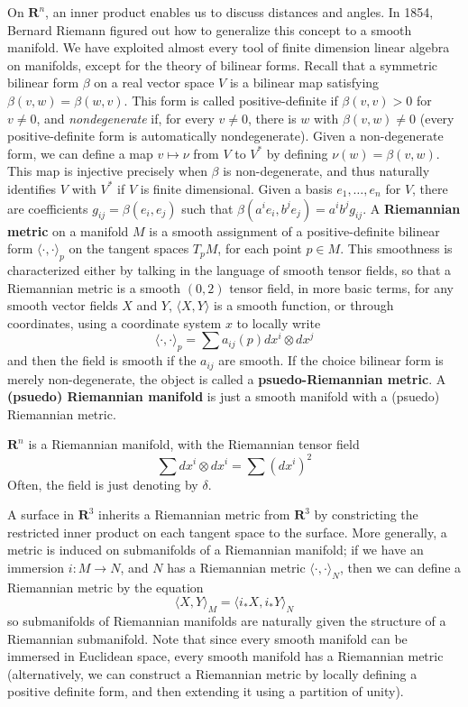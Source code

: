 On $\mathbf{R}^n$, an inner product enables us to discuss distances and angles. In 1854, Bernard Riemann figured out how to generalize this concept to a smooth manifold. We have exploited almost every tool of finite dimension linear algebra on manifolds, except for the theory of bilinear forms. Recall that a symmetric bilinear form $\beta$ on a real vector space $V$ is a bilinear map satisfying $\beta(v,w) = \beta(w,v)$. This form is called positive-definite if $\beta(v,v) > 0$ for $v \neq 0$, and {\it nondegenerate} if, for every $v \neq 0$, there is $w$ with $\beta(v,w) \neq 0$ (every positive-definite form is automatically nondegenerate). Given a non-degenerate form, we can define a map $v \mapsto \nu$ from $V$ to $V^*$ by defining $\nu(w) = \beta(v,w)$. This map is injective precisely when $\beta$ is non-degenerate, and thus naturally identifies $V$ with $V^*$ if $V$ is finite dimensional. Given a basis $e_1, \dots, e_n$ for $V$, there are coefficients $g_{ij} = \beta(e_i,e_j)$ such that $\beta(a^ie_i, b^je_j) = a^i b^j g_{ij}$. A {\bf Riemannian metric} on a manifold $M$ is a smooth assignment of a positive-definite bilinear form $\langle \cdot, \cdot \rangle_p$ on the tangent spaces $T_p M$, for each point $p \in M$. This smoothness is characterized either by talking in the language of smooth tensor fields, so that a Riemannian metric is a smooth $(0,2)$ tensor field, in more basic terms, for any smooth vector fields $X$ and $Y$, $\langle X, Y \rangle$ is a smooth function, or through coordinates, using a coordinate system $x$ to locally write
%
\[ \langle \cdot, \cdot \rangle_p = \sum a_{ij}(p) dx^i \otimes dx^j \]
%
and then the field is smooth if the $a_{ij}$ are smooth. If the choice bilinear form is merely non-degenerate, the object is called a {\bf psuedo-Riemannian metric}. A {\bf (psuedo) Riemannian manifold} is just a smooth manifold with a (psuedo) Riemannian metric.

\begin{example}
    $\mathbf{R}^n$ is a Riemannian manifold, with the Riemannian tensor field
    \[ \sum dx^i \otimes dx^i = \sum (dx^i)^2 \]
    Often, the field is just denoting by $\delta$.
\end{example}

\begin{example}
    A surface in $\mathbf{R}^3$ inherits a Riemannian metric from $\mathbf{R}^3$ by constricting the restricted inner product on each tangent space to the surface. More generally, a metric is induced on submanifolds of a Riemannian manifold; if we have an immersion $i: M \to N$, and $N$ has a Riemannian metric $\langle \cdot, \cdot \rangle_N$, then we can define a Riemannian metric by the equation
    \[ \langle X, Y \rangle_M = \langle i_*X, i_*Y \rangle_N \]
    so submanifolds of Riemannian manifolds are naturally given the structure of a Riemannian submanifold. Note that since every smooth manifold can be immersed in Euclidean space, every smooth manifold has a Riemannian metric (alternatively, we can construct a Riemannian metric by locally defining a positive definite form, and then extending it using a partition of unity).
\end{example}

